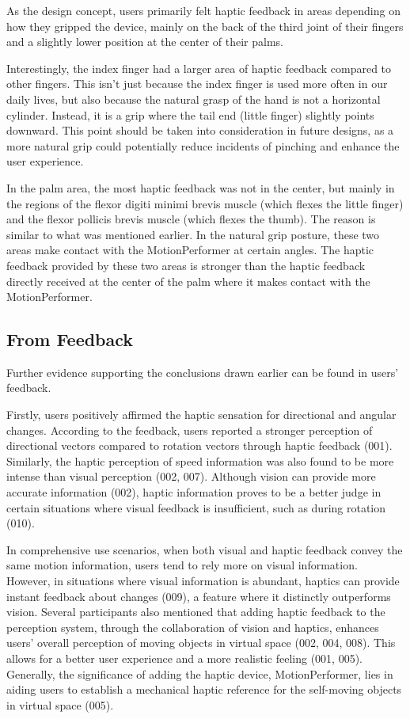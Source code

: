 As the design concept, users primarily felt haptic feedback in areas depending on how they gripped the device, mainly on the back of the third joint of their fingers and a slightly lower position at the center of their palms. 

Interestingly, the index finger had a larger area of haptic feedback compared to other fingers. This isn't just because the index finger is used more often in our daily lives, but also because the natural grasp of the hand is not a horizontal cylinder. Instead, it is a grip where the tail end (little finger) slightly points downward. This point should be taken into consideration in future designs, as a more natural grip could potentially reduce incidents of pinching and enhance the user experience.

In the palm area, the most haptic feedback was not in the center, but mainly in the regions of the flexor digiti minimi brevis muscle (which flexes the little finger) and the flexor pollicis brevis muscle (which flexes the thumb). The reason is similar to what was mentioned earlier. In the natural grip posture, these two areas make contact with the MotionPerformer at certain angles. The haptic feedback provided by these two areas is stronger than the haptic feedback directly received at the center of the palm where it makes contact with the MotionPerformer.

\subsection{From Feedback}
Further evidence supporting the conclusions drawn earlier can be found in users' feedback.

Firstly, users positively affirmed the haptic sensation for directional and angular changes. According to the feedback, users reported a stronger perception of directional vectors compared to rotation vectors through haptic feedback (001). Similarly, the haptic perception of speed information was also found to be more intense than visual perception (002, 007). Although vision can provide more accurate information (002), haptic information proves to be a better judge in certain situations where visual feedback is insufficient, such as during rotation (010).

In comprehensive use scenarios, when both visual and haptic feedback convey the same motion information, users tend to rely more on visual information. However, in situations where visual information is abundant, haptics can provide instant feedback about changes (009), a feature where it distinctly outperforms vision. Several participants also mentioned that adding haptic feedback to the perception system, through the collaboration of vision and haptics, enhances users' overall perception of moving objects in virtual space (002, 004, 008). This allows for a better user experience and a more realistic feeling (001, 005). Generally, the significance of adding the haptic device, MotionPerformer, lies in aiding users to establish a mechanical haptic reference for the self-moving objects in virtual space (005).

